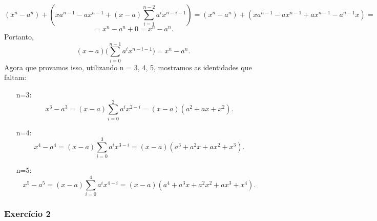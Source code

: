 \documentclass[exercícios_de_cálculo.tex]{subfiles}
\begin{document}
\begin{proof*}
	$$
		(x^n - a^n) + (xa^{n-1} - ax^{n-1} + (x-a)\sum_{i=1}^{n-2}a^ix^{n-i-1}) = (x^n - a^n) + (xa^{n-1} - ax^{n-1} + ax^{n-1} - a^{n-1}x ) =
	$$
	$$
		= x^n - a^n + 0 = x^n - a^n.
	$$
	Portanto,
	$$
		(x - a)\biggl(\sum_{i=0}^{n-1}a^ix^{n-i-1}\biggr) = x^n - a^n.
	$$
	Agora que provamos isso, utilizando n = 3, 4, 5, mostramos as identidades que faltam:
	\begin{itemize}
		\item[n=3:] $$ x^3 - a^3 = (x-a)\sum_{i=0}^{2}a^ix^{2-i} = (x-a)(a^2 + ax + x^2). $$
		\item[n=4:] $$ x^4 - a^4 = (x-a)\sum_{i=0}^{3}a^ix^{3-i} = (x-a)(a^3 + a^2x + ax^2 + x^3). $$
		\item[n=5:] $$ x^5 - a^5 = (x-a)\sum_{i=0}^{4}a^ix^{4-i} = (x-a)(a^4 + a^3x + a^2x^2 + ax^3 + x^4).$$
	\end{itemize}
	\qedsymbol
\end{proof*}

\subsubsection{Exercício 2}
\end{document}
